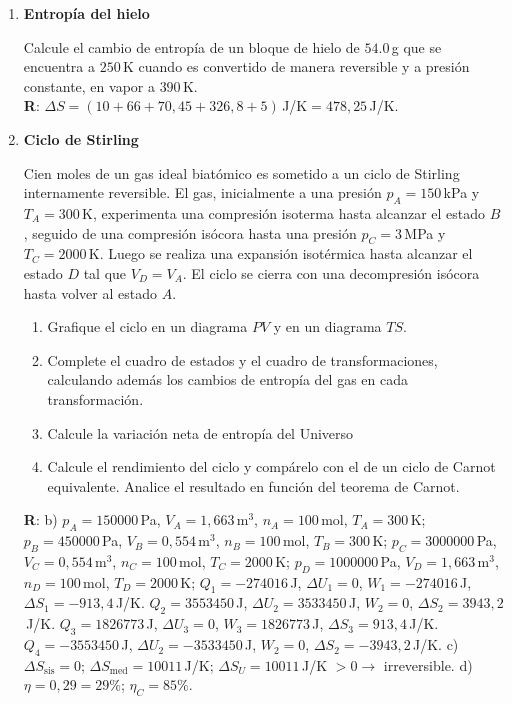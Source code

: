\documentclass[a4paper,12pt]{article}
\begin{document}
\begin{enumerate}
	\item {\bf{Entropía del hielo}}

		Calcule el cambio de entropía de un bloque de hielo de $54.0$\,g que se
		encuentra a $250$\,K cuando es convertido de manera reversible y a
		presión constante, en vapor a $390$\,K.
        \\{\bf{R}}: $\Delta S=(10+66+70,45+326,8+5)$\,J/K$=478,25$\,J/K.
	

	\item {\bf{Ciclo de Stirling}}

		Cien moles de un gas ideal biatómico es sometido a un ciclo de Stirling
		internamente reversible. El gas, inicialmente a una presión
		$p_A=150$\,kPa y $T_A=300$\,K, experimenta una compresión isoterma
		hasta alcanzar el estado $B$, seguido de una compresión isócora hasta
		una presión $p_C=3$\,MPa y $T_C=2000$\,K. Luego se realiza una
		expansión isotérmica hasta alcanzar el estado $D$ tal que $V_D=V_A$. El
		ciclo se cierra con una decompresión isócora hasta volver al estado
		$A$.
		\begin{enumerate}
			\item Grafique el ciclo en un diagrama $PV$ y en un diagrama $TS$.
			\item Complete el cuadro de estados y el cuadro de
				transformaciones, calculando además los cambios de entropía del
				gas en cada transformación.
			\item Calcule la variación neta de entropía del Universo
			\item Calcule el rendimiento del ciclo y compárelo con el de un
				ciclo de Carnot equivalente. Analice el resultado en función
				del teorema de Carnot.
		\end{enumerate}
        {\bf{R}}: b) 
		$p_A=150000$\,Pa, $V_A=1,663$\,m$^3$, $n_A=100$\,mol, $T_A=300$\,K; 
		$p_B=450000$\,Pa, $V_B=0,554$\,m$^3$, $n_B=100$\,mol, $T_B=300$\,K; 
		$p_C=3000000$\,Pa, $V_C=0,554$\,m$^3$, $n_C=100$\,mol, $T_C=2000$\,K; 
		$p_D=1000000$\,Pa, $V_D=1,663$\,m$^3$, $n_D=100$\,mol, $T_D=2000$\,K; 
		$Q_1=-274016$\,J, $\Delta U_1=0$, $W_1=-274016$\,J, $\Delta S_1=-913,4$\,J/K.
		$Q_2=3553450$\,J, $\Delta U_2=3533450$\,J, $W_2=0$, $\Delta S_2=3943,2$\,J/K.
		$Q_3=1826773$\,J, $\Delta U_3=0$, $W_3=1826773$\,J, $\Delta S_3=913,4$\,J/K.
		$Q_4=-3553450$\,J, $\Delta U_2=-3533450$\,J, $W_2=0$, $\Delta S_2=-3943,2$\,J/K.
		c) $\Delta S_{\mathrm{sis}} = 0$; $\Delta S_{\mathrm{med}}=10011$\,J/K;
		$\Delta S_U=10011$\,J/K $>0 \to$ irreversible. 
		d) $\eta= 0,29 = 29\%$; $\eta_C=85\%$.


\end{enumerate}
\end{document}
